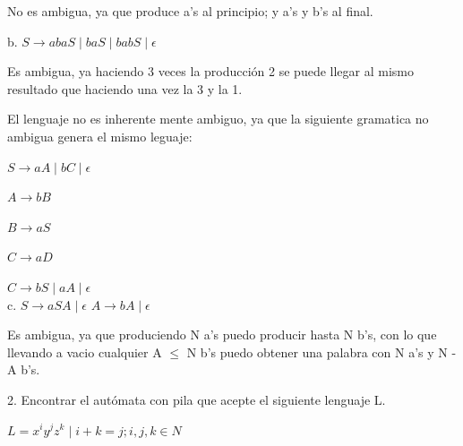 \documentclass{article}
\begin{document}
\hspace{1cm} No es ambigua, ya que produce a's al principio; y a's y b's al final.

\hspace{1cm} b. $S \rightarrow abaS \mid baS \mid babS \mid \epsilon$ 

\hspace{1cm} Es ambigua, ya haciendo 3 veces la producción 2 se puede llegar al mismo resultado que haciendo una vez la 3 y la 1.

\hspace{1cm} El lenguaje no es inherente mente ambiguo, ya que la siguiente gramatica no ambigua genera el mismo leguaje:

\hspace{2cm} $S \rightarrow aA \mid bC \mid \epsilon$

\hspace{2cm} $A \rightarrow bB$

\hspace{2cm} $B \rightarrow aS$

\hspace{2cm} $C \rightarrow aD$

\hspace{2cm} $C \rightarrow bS \mid aA \mid \epsilon$\\

\hspace{1cm} c. $S \rightarrow aSA \mid \epsilon$ $A \rightarrow bA \mid \epsilon$ 

\hspace{1cm} Es ambigua, ya que produciendo N a's puedo producir hasta N b's, con lo que llevando a vacio cualquier A $\le$ N b's puedo obtener una palabra con N a's y N - A b's.

\vspace{0,65cm}

2. Encontrar el autómata con pila que acepte el siguiente lenguaje L.\\

\begin{center}
$L = {x^{i}y^{j}z^{k} \mid i+k=j; i,j,k \in N}$
\end{center}

\end{document}
